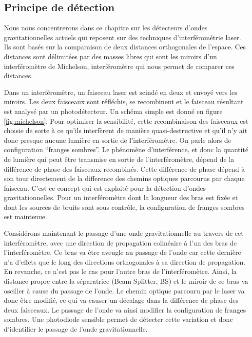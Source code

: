 
\subsection{Principe de détection}
\label{sec:detection_principle}

Nous nous concentrerons dans ce chapitre sur les détecteurs d'ondes gravitationnelles actuels qui reposent sur des techniques d'interférométrie laser.
Ils sont basés sur la comparaison de deux distances orthogonales de l'espace. Ces distances sont délimitées par des masses libres qui sont les miroirs d'un interféromètre de Michelson, interféromètre qui nous permet de comparer ces distances.

Dans un interféromètre, un faisceau laser est scindé en deux et envoyé vers les miroirs.
Les deux faisceaux sont réfléchis, se recombinent et le faisceau résultant est analysé par un photodétecteur.
Un schéma simple est donné en figure \ref{fig:michelson}.
Pour optimiser la sensibilité, cette recombinaison des faisceaux est choisie de sorte à ce qu'ils interfèrent de manière quasi-destructive et qu'il n'y ait donc presque aucune lumière en sortie de l'interféromètre.
On parle alors de configuration ``franges sombres''.
Le phénomène d'interférence, et donc la quantité de lumière qui peut être transmise en sortie de l'interféromètre, dépend de la différence de phase des faisceaux recombinés.
Cette différence de phase dépend à son tour directement de la difference des chemins optiques parcourus par chaque faisceau.
C'est ce concept qui est exploité pour la détection d'ondes gravitationnelles.
Pour un interféromètre dont la longueur des bras est fixée et dont les sources de bruits sont sous contrôle, la configuration de franges sombres est maintenue.

Considérons maintenant le passage d'une onde gravitationnelle au travers de cet interféromètre, avec une direction de propagation colinéaire à l'un des bras de l'interféromètre.
Ce bras va être aveugle au passage de l'onde car cette dernière n'a d'effets que le long des directions orthogonales à sa direction de propagation.
En revanche, ce n'est pas le cas pour l'autre bras de l'interféromètre.
Ainsi, la distance propre entre la séparatrice (Beam Splitter, BS) et le miroir de ce bras va osciller à cause du passage de l'onde.
Le chemin optique parcouru par le laser va donc être modifié, ce qui va causer un décalage dans la différence de phase des deux faisceaux.
Le passage de l'onde va ainsi modifier la configuration de franges sombres.
Une photodiode sensible permet de détecter cette variation et donc d'identifier le passage de l'onde gravitationnelle.

